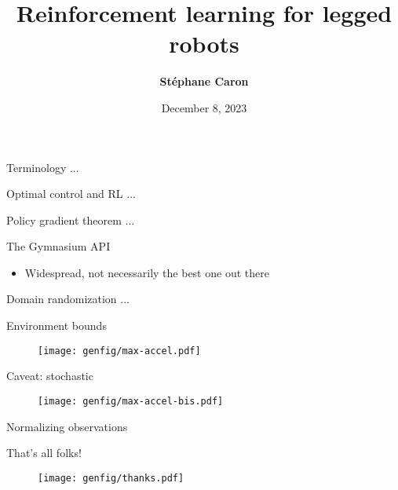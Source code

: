 \documentclass[9pt, aspectratio=43]{beamer}
\title{
    Reinforcement learning for legged robots
}
\author{\textbf{St\'ephane Caron}}
\date{December 8, 2023}
\institute{Inria--\'{E}cole normale sup\'{e}rieure}
\begin{document}
\maketitle


\begin{frame}{Terminology}
    ...
\end{frame}

\begin{frame}{Optimal control and RL}
    ...
\end{frame}

\begin{frame}{Policy gradient theorem}
    ...
\end{frame}

\begin{frame}{The Gymnasium API}
    \begin{itemize}
        \item Widespread, not necessarily the best one out there
    \end{itemize}
\end{frame}

\begin{frame}{Domain randomization}
    ...
\end{frame}

\begin{frame}{Environment bounds}
    \begin{figure}
        \texttt{[image: genfig/max-accel.pdf]}
    \end{figure}
\end{frame}

\begin{frame}{Caveat: stochastic}
    \begin{figure}
        \texttt{[image: genfig/max-accel-bis.pdf]}
    \end{figure}
\end{frame}

\begin{frame}{Normalizing observations}
    \begin{figure}
    \end{figure}
\end{frame}

\begin{frame}{That's all folks!}
    \vspace{2em}
    \begin{figure}
        \centering
        \texttt{[image: genfig/thanks.pdf]}
    \end{figure}
\end{frame}
\end{document}
